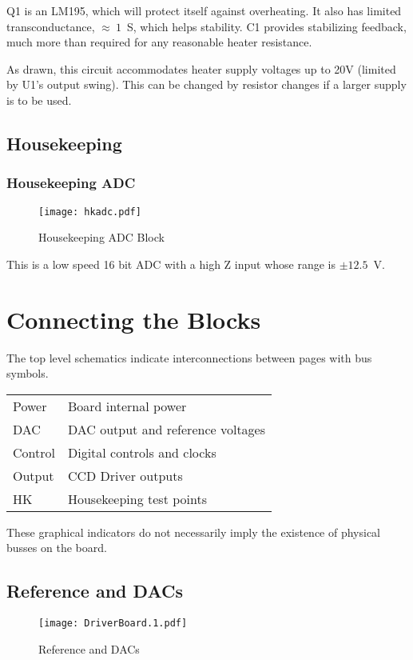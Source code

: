 \documentclass[a4paper,12pt]{article}
\begin{document}
Q1 is an LM195, which will protect itself against overheating. It also has limited transconductance, $\approx\ 1$\ S, which helps stability. C1 provides stabilizing feedback, much more than required for any reasonable heater resistance.

As drawn, this circuit accommodates heater supply voltages up to 20V (limited by U1's output swing). This can be changed by resistor changes if a larger supply is to be used.

\subsection{Housekeeping}

\subsubsection{Housekeeping ADC}
   \begin{figure}
   \begin{center}
   \texttt{[image: hkadc.pdf]}
   \end{center}
   \caption{Housekeeping ADC Block}
   \end{figure}

This is a low speed 16 bit ADC with a high Z input whose range is $\pm 12.5$\ V.

\section{Connecting the Blocks}

The top level schematics indicate interconnections between pages with bus symbols.

\begin{tabular}{ll}
Power & Board internal power \\
DAC & DAC output and reference voltages \\
Control & Digital controls and clocks \\
Output & CCD Driver outputs \\
HK & Housekeeping test points \\
\end{tabular}

These graphical indicators do not necessarily imply the existence of physical busses on the board.

\subsection{Reference and DACs}
   \begin{figure}
   \begin{center}
   \texttt{[image: DriverBoard.1.pdf]}
   \end{center}
   \caption{Reference and DACs}
   \end{figure}
   
\end{document}
